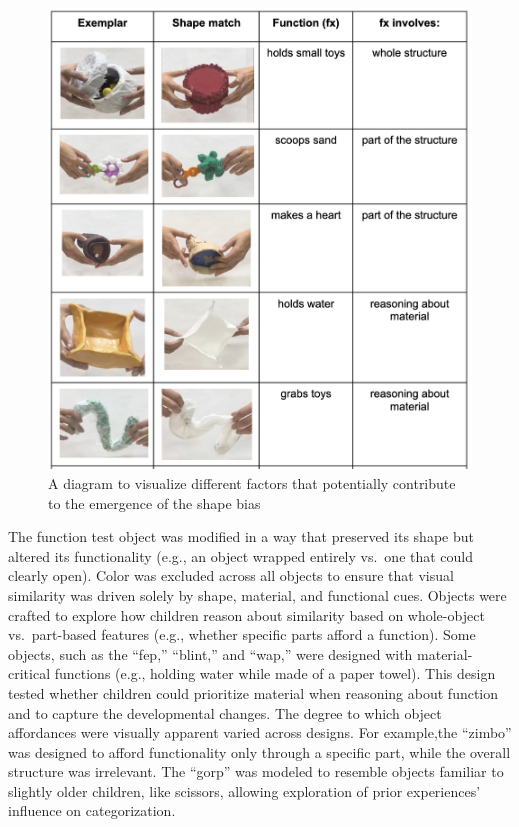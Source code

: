 \documentclass[10pt, letterpaper]{article}
\begin{document}
\begin{CodeChunk}
\begin{figure}[tb]
\includegraphics[width=1\linewidth]{stimuli} \caption[A diagram to visualize different factors that potentially contribute to the emergence of the shape bias]{A diagram to visualize different factors that potentially contribute to the emergence of the shape bias}\label{fig:stimulipics }
\end{figure}
\end{CodeChunk}

The function test object was modified in a way that preserved its shape
but altered its functionality (e.g., an object wrapped entirely vs.~one
that could clearly open). Color was excluded across all objects to
ensure that visual similarity was driven solely by shape, material, and
functional cues. Objects were crafted to explore how children reason
about similarity based on whole-object vs.~part-based features (e.g.,
whether specific parts afford a function). Some objects, such as the
``fep,'' ``blint,'' and ``wap,'' were designed with material-critical
functions (e.g., holding water while made of a paper towel). This design
tested whether children could prioritize material when reasoning about
function and to capture the developmental changes. The degree to which
object affordances were visually apparent varied across designs. For
example,the ``zimbo'' was designed to afford functionality only through
a specific part, while the overall structure was irrelevant. The
``gorp'' was modeled to resemble objects familiar to slightly older
children, like scissors, allowing exploration of prior experiences'
influence on categorization.
\end{document}
